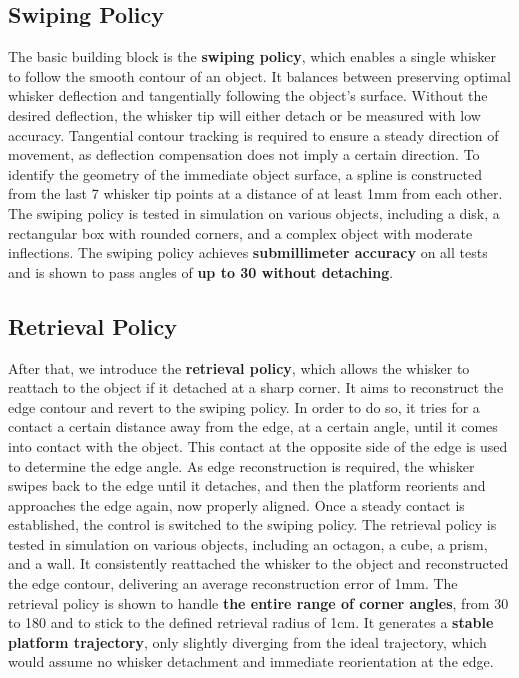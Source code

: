 \subsection{Swiping Policy}
The basic building block is the \textbf{swiping policy}, which enables a single whisker to follow the smooth contour of an object.
It balances between preserving optimal whisker deflection and tangentially following the object's surface.
Without the desired deflection, the whisker tip will either detach or be measured with low accuracy.
Tangential contour tracking is required to ensure a steady direction of movement, as deflection compensation does not imply a certain direction.
To identify the geometry of the immediate object surface, a spline is constructed from the last 7 whisker tip points at a distance of at least 1mm from each other.
The swiping policy is tested in simulation on various objects, including a disk, a rectangular box with rounded corners, and a complex object with moderate inflections.
The swiping policy achieves \textbf{submillimeter accuracy} on all tests and is shown to pass angles of \textbf{up to 30\degree{} without detaching}.

\subsection{Retrieval Policy}
After that, we introduce the \textbf{retrieval policy}, which allows the whisker to reattach to the object if it detached at a sharp corner.
It aims to reconstruct the edge contour and revert to the swiping policy.
In order to do so, it tries for a contact a certain distance away from the edge, at a certain angle, until it comes into contact with the object.
This contact at the opposite side of the edge is used to determine the edge angle.
As edge reconstruction is required, the whisker swipes back to the edge until it detaches, and then the platform reorients and approaches the edge again, now properly aligned.
Once a steady contact is established, the control is switched to the swiping policy.
The retrieval policy is tested in simulation on various objects, including an octagon, a cube, a prism, and a wall.
It consistently reattached the whisker to the object and reconstructed the edge contour, delivering an average reconstruction error of 1mm.
The retrieval policy is shown to handle \textbf{the entire range of corner angles}, from 30\degree{} to 180\degree{} and to stick to the defined retrieval radius of 1cm.
It generates a \textbf{stable platform trajectory}, only slightly diverging from the ideal trajectory, which would assume no whisker detachment and immediate reorientation at the edge.

